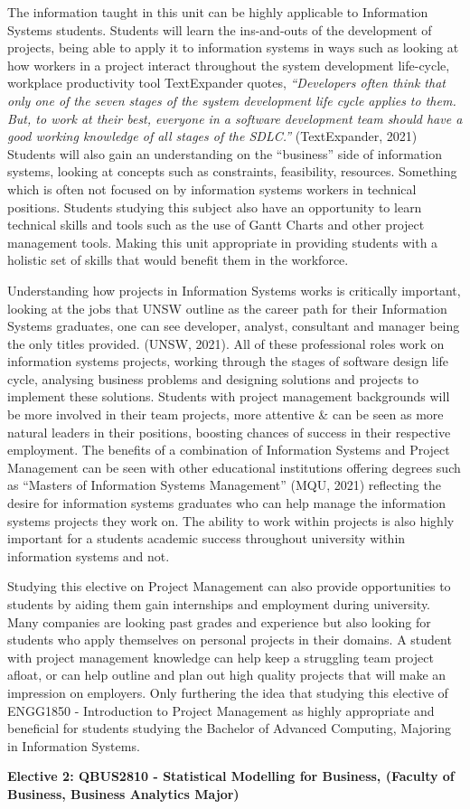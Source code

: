 The information taught in this unit can be highly applicable to Information Systems students. Students will learn the ins-and-outs of the development of projects, being able to apply it to information systems in ways such as looking at how workers in a project interact throughout the system development life-cycle, workplace productivity tool TextExpander quotes, \textit{“Developers often think that only one of the seven stages of the system development life cycle applies to them. But, to work at their best, everyone in a software development team should have a good working knowledge of all stages of the SDLC.”} (TextExpander, 2021) Students will also gain an understanding on the “business” side of information systems, looking at concepts such as constraints, feasibility, resources. Something which is often not focused on by information systems workers in technical positions. Students studying this subject also have an opportunity to learn technical skills and tools such as the use of Gantt Charts and other project management tools. Making this unit appropriate in providing students with a holistic set of skills that would benefit them in the workforce.


Understanding how projects in Information Systems works is critically important, looking at the jobs that UNSW outline as the career path for their Information Systems graduates, one can see developer, analyst, consultant and manager being the only titles provided. (UNSW, 2021). All of these professional roles work on information systems projects, working through the stages of software design life cycle, analysing business problems and designing solutions and projects to implement these solutions. Students with project management backgrounds will be more involved in their team projects, more attentive & can be seen as more natural leaders in their positions, boosting chances of success in their respective employment. The benefits of a combination of Information Systems and Project Management can be seen with other educational institutions offering degrees such as “Masters of Information Systems Management” (MQU, 2021) reflecting the desire for information systems graduates who can help manage the information systems projects they work on. The ability to work within projects is also highly important for a students academic success throughout university within information systems and not.



Studying this elective on Project Management can also provide opportunities to students by aiding them gain internships and employment during university. Many companies are looking past grades and experience but also looking for students who apply themselves on personal projects in their domains. A student with project management knowledge can help keep a struggling team project afloat, or can help outline and plan out high quality projects that will make an impression on employers. Only furthering the idea that studying this elective of ENGG1850 - Introduction to Project Management as highly appropriate and beneficial for students studying the Bachelor of Advanced Computing, Majoring in Information Systems.


\textbf{Elective 2: QBUS2810 - Statistical Modelling for Business, (Faculty of Business, Business Analytics Major)}



